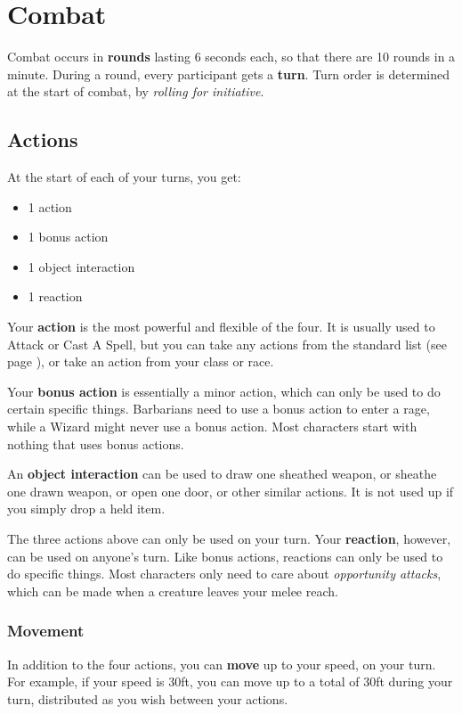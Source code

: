 \documentclass[letterpaper,twocolumn,openany,nodeprecatedcode,bg=print]{dndbook}
\newcommand{\pg}[1]{page \pageref{#1}}
\newcommand{\see}[1]{(see \pg{#1})}
\begin{document}
\section{Combat}
Combat occurs in \textbf{rounds} lasting 6 seconds each, so that there are 10 rounds in a minute. 
During a round, every participant gets a \textbf{turn}. 
Turn order is determined at the start of combat, by \textit{rolling for initiative}.

\subsection{Actions}
At the start of each of your turns, you get:

\begin{itemize}
\item 1 action
\item 1 bonus action
\item 1 object interaction
\item 1 reaction
\end{itemize}

Your \textbf{action} is the most powerful and flexible of the four. 
It is usually used to Attack or Cast A Spell, but you can take any actions from the standard list \see{combat-options}, 
or take an action from your class or race.

Your \textbf{bonus action} is essentially a minor action, which can only be used to do certain specific things. 
Barbarians need to use a bonus action to enter a rage, while a Wizard might never use a bonus action. 
Most characters start with nothing that uses bonus actions.

An \textbf{object interaction} can be used to 
draw one sheathed weapon, 
or sheathe one drawn weapon, 
or open one door, 
or other similar actions. 
It is not used up if you simply drop a held item.

The three actions above can only be used on your turn. 
Your \textbf{reaction}, however, can be used on anyone's turn. 
Like bonus actions, reactions can only be used to do specific things. 
Most characters only need to care about \textit{opportunity attacks}, which can be made when a creature leaves your melee reach.

\subsubsection{Movement}

In addition to the four actions, you can \textbf{move} up to your speed, on your turn. 
For example, if your speed is 30ft, you can move up to a total of 30ft during your turn, distributed as you wish between your actions.
\end{document}
